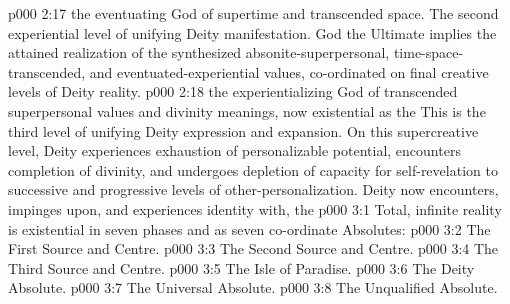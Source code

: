 \vs p000 2:17 \bibnobreakspace {} the eventuating God of supertime and transcended space. The second experiential level of unifying Deity manifestation. God the Ultimate implies the attained realization of the synthesized absonite\hyp{}superpersonal, time\hyp{}space\hyp{}transcended, and eventuated\hyp{}experiential values, co\hyp{}ordinated on final creative levels of Deity reality.
\vs p000 2:18 \bibnobreakspace {} the experientializing God of transcended superpersonal values and divinity meanings, now existential as the  This is the third level of unifying Deity expression and expansion. On this supercreative level, Deity experiences exhaustion of personalizable potential, encounters completion of divinity, and undergoes depletion of capacity for self\hyp{}revelation to successive and progressive levels of other\hyp{}personalization. Deity now encounters, impinges upon, and experiences identity with, the 
\vs p000 3:1 Total, infinite reality is existential in seven phases and as seven co\hyp{}ordinate Absolutes:
\vs p000 3:2 \bibnobreakspace The First Source and Centre.
\vs p000 3:3 \bibnobreakspace The Second Source and Centre.
\vs p000 3:4 \bibnobreakspace The Third Source and Centre.
\vs p000 3:5 \bibnobreakspace The Isle of Paradise.
\vs p000 3:6 \bibnobreakspace The Deity Absolute.
\vs p000 3:7 \bibnobreakspace The Universal Absolute.
\vs p000 3:8 \bibnobreakspace The Unqualified Absolute.
